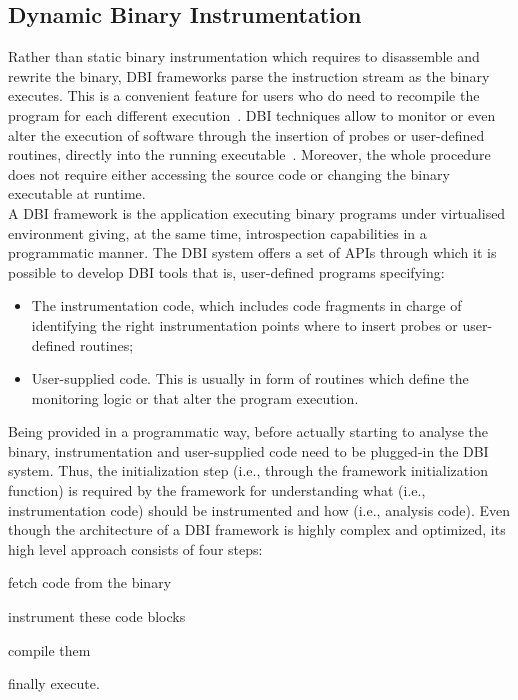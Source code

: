 \documentclass[LaM,binding=0.6cm]{sapthesis}
\begin{document}
\subsection{Dynamic Binary Instrumentation}
\label{subsec:dbi}
Rather than static binary instrumentation which requires to disassemble and rewrite the binary, DBI frameworks parse the instruction stream as the binary executes. This is a convenient feature for users who do need to recompile the program for each different execution~\cite{nethercote2007valgrind}. DBI techniques allow to monitor or even alter the execution of software through the insertion of probes or user-defined routines, directly into the running executable~\cite{d2019sok}. Moreover, the whole procedure does not require either accessing the source code or changing the binary executable at runtime.\\
A DBI framework is the application executing binary programs under virtualised environment giving, at the same time, introspection capabilities in a programmatic manner. The DBI system offers a set of APIs through which it is possible to develop DBI tools that is, user-defined programs specifying:
\begin{itemize}
\item The instrumentation code, which includes code fragments in charge of identifying the right instrumentation points where to insert probes or user-defined routines;
\item User-supplied code. This is usually in form of routines which define the monitoring logic or that alter the program execution.
\end{itemize}
Being provided in a programmatic way, before actually starting to analyse the binary, instrumentation and user-supplied code need to be plugged-in the DBI system. Thus, the initialization step (i.e., through the framework initialization function) is required by the framework for understanding what (i.e., instrumentation code) should be instrumented and how (i.e., analysis code). Even though the architecture of a DBI framework is highly complex and optimized, its high level approach consists of four steps: 
\begin{enumerate*}[label=\roman*),itemjoin={,\quad}]
\item fetch code from the binary
\item instrument these code blocks
\item compile them
\item finally execute.
\end{enumerate*}
\end{document}
